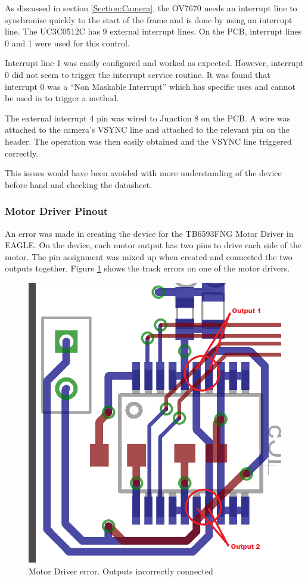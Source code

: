As discussed in section \ref{Section:Camera}, the OV7670 needs an interrupt line to synchronise quickly to the start of the frame and is done by using an interrupt line. The UC3C0512C has 9 external interrupt lines. On the PCB, interrupt lines 0 and 1 were used for this control.

Interrupt line 1 was easily configured and worked as expected. However, interrupt 0 did not seem to trigger the interrupt service routine. It was found that interrupt 0 was a ``Non Maskable Interrupt'' which has specific uses and cannot be used in to trigger a method. 

The external interrupt 4 pin was wired to Junction 8 on the PCB. A wire was attached to the camera's VSYNC line and attached to the relevant pin on the header. The operation was then easily obtained and the VSYNC line triggered correctly.

This issues would have been avoided with more understanding of the device before hand and checking the datasheet.


\subsubsection{Motor Driver Pinout}

An error was made in creating the device for the TB6593FNG Motor Driver in EAGLE. On the device, each motor output has two pins to drive each side of the motor. The pin assignment was mixed up when created and connected the two outputs together. Figure \ref{fig:Motor:Error} shows the track errors on one of the motor drivers. 

\begin{figure}
\centering
\includegraphics[width = \textwidth /2]{./Figures/MotorDriver_error.png}
\caption{Motor Driver error. Outputs incorrectly connected}
\label{fig:Motor:Error}
\end{figure}

